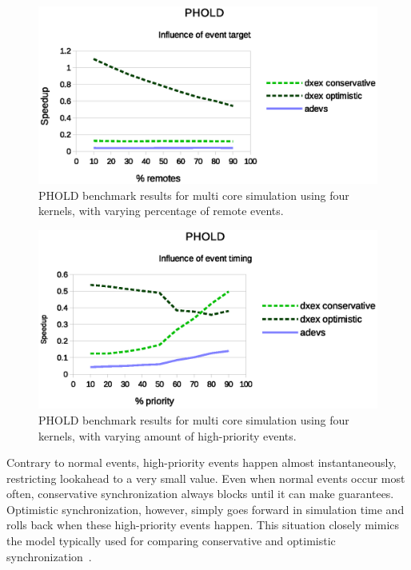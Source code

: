 \begin{figure}
    \center
    \includegraphics[width=\columnwidth]{fig/phold_remotes.eps}
    \caption{PHOLD benchmark results for multi core simulation using four kernels, with varying percentage of remote events.}
\end{figure}

\begin{figure}
	\center
	\includegraphics[width=\columnwidth]{fig/phold_priority.eps}
	\caption{PHOLD benchmark results for multi core simulation using four kernels, with varying amount of high-priority events.}
	\label{fig:phold_priority}
\end{figure}

Contrary to normal events, high-priority events happen almost instantaneously, restricting lookahead to a very small value.
Even when normal events occur most often, conservative synchronization always blocks until it can make guarantees.
Optimistic synchronization, however, simply goes forward in simulation time and rolls back when these high-priority events happen.
This situation closely mimics the model typically used for comparing conservative and optimistic synchronization~\cite{FujimotoBook}.

